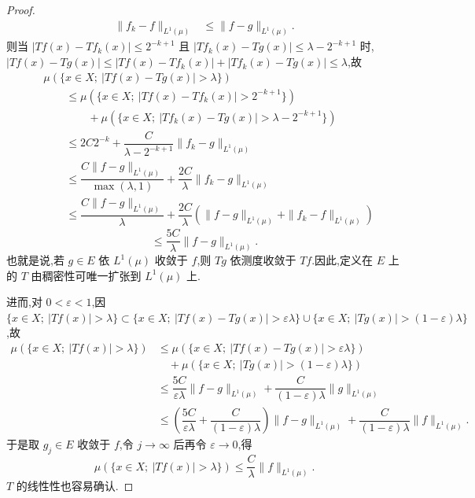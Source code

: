\begin{proof}
\begin{align*}
\| f_{k} - f \|_{L^{1}(\mu)} &\leq \| f - g \|_{L^{1}(\mu)}.
\end{align*}
则当 $|Tf(x) - Tf_{k}(x)| \leq 2^{-k+1}$ 且 $|Tf_{k}(x) - Tg(x)| \leq \lambda - 2^{-k+1}$ 时,$|Tf(x) - Tg(x)| \leq |Tf(x) - Tf_{k}(x)| + |Tf_{k}(x) - Tg(x)| \leq \lambda$,故
\begin{align*}
& \mu(\{x \in X;\ |Tf(x) - Tg(x)| > \lambda\}) \\
& \qquad \leq \mu(\{x \in X;\ |Tf(x) - Tf_{k}(x)| > 2^{-k+1}\}) \\
& \qquad\qquad + \mu(\{x \in X;\ |Tf_{k}(x) - Tg(x)| > \lambda - 2^{-k+1}\}) \\
& \qquad \leq 2C2^{-k} + \dfrac{C}{\lambda - 2^{-k+1}}\| f_{k} - g \|_{L^{1}(\mu)} \\
& \qquad \leq \dfrac{C\| f - g \|_{L^{1}(\mu)}}{\max(\lambda, 1)} + \dfrac{2C}{\lambda}\| f_{k} - g \|_{L^{1}(\mu)} \\
& \qquad \leq \dfrac{C\| f - g \|_{L^{1}(\mu)}}{\lambda} + \dfrac{2C}{\lambda}\left(\| f - g \|_{L^{1}(\mu)} + \| f_{k} - f \|_{L^{1}(\mu)}\right)
\end{align*}
\begin{equation*}
\leq \frac{5C}{\lambda}\| f - g \|_{L^{1}(\mu)}.
\end{equation*}
也就是说,若 $g \in E$ 依 $L^{1}(\mu)$ 收敛于 $f$,则 $Tg$ 依测度收敛于 $Tf$.因此,定义在 $E$ 上的 $T$ 由稠密性可唯一扩张到 $L^{1}(\mu)$ 上.

进而,对 $0 < \varepsilon < 1$,因 $\{x \in X;\ |Tf(x)| > \lambda\} \subset \{x \in X;\ |Tf(x) - Tg(x)| > \varepsilon\lambda\} \cup \{x \in X;\ |Tg(x)| > (1 - \varepsilon)\lambda\}$,故
\begin{align*}
\mu(\{x \in X;\ |Tf(x)| > \lambda\}) &\leq \mu(\{x \in X;\ |Tf(x) - Tg(x)| > \varepsilon\lambda\})  \\
& \quad + \mu(\{x \in X;\ |Tg(x)| > (1 - \varepsilon)\lambda\}) \\
& \leq \dfrac{5C}{\varepsilon\lambda}\| f - g \|_{L^{1}(\mu)} + \dfrac{C}{(1 - \varepsilon)\lambda}\| g \|_{L^{1}(\mu)} \\
& \leq \left(\dfrac{5C}{\varepsilon\lambda} + \dfrac{C}{(1 - \varepsilon)\lambda}\right)\| f - g \|_{L^{1}(\mu)} + \dfrac{C}{(1 - \varepsilon)\lambda}\| f \|_{L^{1}(\mu)}.
\end{align*}
于是取 $g_{j} \in E$ 收敛于 $f$,令 $j \to \infty$ 后再令 $\varepsilon \to 0$,得
\begin{equation*}
\mu(\{x \in X;\ |Tf(x)| > \lambda\}) \leq \frac{C}{\lambda}\| f \|_{L^{1}(\mu)}.
\end{equation*}
$T$ 的线性性也容易确认.
\end{proof}

